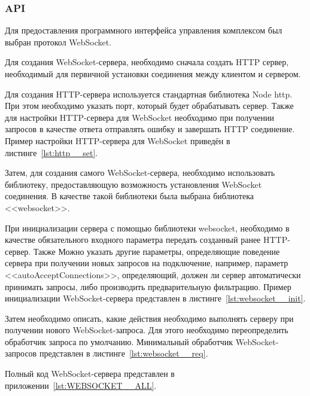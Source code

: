 \subsubsection{API}

Для предоставления программного интерфейса управления комплексом был выбран протокол WebSocket.

Для создания WebSocket-сервера, необходимо сначала создать HTTP сервер, необходимый для первичной установки соединения между клиентом и сервером.

Для создания HTTP-сервера используется стандартная библиотека Node http. При этом необходимо указать порт, который будет обрабатывать сервер. Также для настройки HTTP-сервера для WebSocket необходимо при получении запросов в качестве ответа отправлять ошибку и завершать HTTP соединение. Пример настройки HTTP-сервера для WebSocket приведён в листинге~\ref{lst:http__set}.



Затем, для создания самого WebSocket-сервера, необходимо использовать библиотеку, предоставляющую возможность установления WebSocket соединения. В качестве такой библиотеки была выбрана библиотека <<websocket>>.

При инициализации сервера с помощью библиотеки websocket, необходимо в качестве обязательного входного параметра передать созданный ранее HTTP-сервер. Также Можно указать другие параметры, определяющие поведение сервера при получении новых запросов на подключение, например, параметр <<autoAcceptConnections>>, определяющий, должен ли сервер автоматически принимать запросы, либо производить предварительную фильтрацию. Пример инициализации WebSocket-сервера представлен в листинге~\ref{lst:websocket__init}.



Затем необходимо описать, какие действия необходимо выполнять серверу при получении нового WebSocket-запроса. Для этого необходимо переопределить обработчик запроса по умолчанию. Минимальный обработчик WebSoc\-ket-запросов представлен в листинге~\ref{lst:websocket__req}.



Полный код WebSocket-сервера представлен в приложении~\ref{lst:WEBSOCKET__ALL}.
